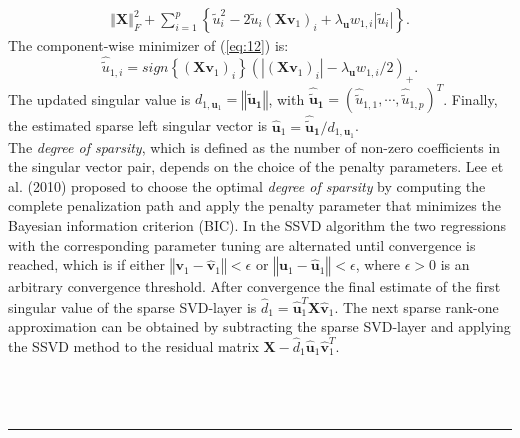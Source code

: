 \documentclass{bioinfo}
\begin{document}
\begin{methods}
\begin{equation}
\begin{split}
\left\Vert \mathbf{X} \right\Vert_{F}^{2} + \sum_{i=1}^{p} \left\{ \tilde{u}_{i}^2 - 2\tilde{u}_{i}(\mathbf{X}\mathbf{v}_{1})_{i} + \lambda_{\mathbf{u}} w_{1,i}|\tilde{u}_{i}|\right\}.
\end{split}  
\label{eq:12}    
\end{equation} 
The component-wise minimizer of (\ref{eq:12}) is:
\begin{equation}
\hat{\tilde{u}}_{1,i}=\textit{sign}\left\{(\mathbf{X}\mathbf{v}_{1})_{i}\right\}(|(\mathbf{X}\mathbf{v}_{1})_{i}|-\lambda_{\mathbf{u}}w_{1,i}/2)_{+}.
\end{equation}
The updated singular value is $d_{1,\mathbf{u}_{1}}=\left\Vert\mathbf{\tilde{u}_{1}}\right\Vert$, with $\mathbf{\hat{\tilde{u}}_{1}}=(\hat{\tilde{u}}_{1,1},\cdots,\hat{\tilde{u}}_{1,p})^{T}$. Finally, the estimated sparse left singular vector is $\mathbf{\hat{u}}_{1}=\mathbf{\hat{\tilde{u}}_{1}}/d_{1,\mathbf{u}_{1}}$.\\

The \textit{degree of sparsity}, which is defined as the number of non-zero coefficients in the singular vector pair, depends on the choice of the penalty parameters.
Lee et al. (2010) proposed to choose the optimal \textit{degree of sparsity} by computing the complete penalization path and apply the penalty parameter that minimizes the Bayesian information criterion (BIC). In the SSVD algorithm the two regressions with the corresponding parameter tuning are alternated until convergence is reached, which is if either $\left\Vert \mathbf{v}_{1} - \mathbf{\hat{v}}_{1}\right\Vert < \epsilon$ or $\left\Vert \mathbf{u}_{1} - \mathbf{\hat{u}}_{1} \right\Vert < \epsilon$, where $\epsilon > 0$ is an arbitrary convergence threshold. After convergence the final estimate of the first singular value of the sparse SVD-layer is $\hat{d}_{1}=\mathbf{\hat{u}}_{1}^{T}\mathbf{X}\mathbf{\hat{v}}_{1}$. The next sparse rank-one approximation can be obtained by subtracting the sparse SVD-layer and applying the SSVD method to the residual matrix $\mathbf{X}-\hat{d}_{1}\mathbf{\hat{u}}_{1}\mathbf{\hat{v}}_{1}^{T}$. \\
\\
\\
\\
\hspace{-0.1cm} 
\rule{8.5 cm}{1pt}


\end{methods}
\end{document}
